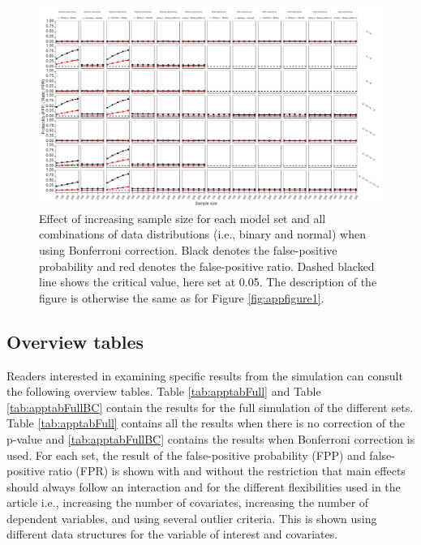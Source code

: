 \begin{landscape}
\begin{figure}[ht!]
\includegraphics[scale=0.75]{R/Analysis/Result/Figures/Figure1DSIBon.jpeg}
\centering
\caption{Effect of increasing sample size for each model set and all combinations of data distributions (i.e., binary and normal) when using Bonferroni correction. Black denotes the false-positive probability and red denotes the false-positive ratio. Dashed blacked line shows the critical value, here set at 0.05. The description of the figure is otherwise the same as for Figure \ref{fig:appfigure1}.}
\label{fig:appfigure12}
\end{figure}
\end{landscape}

\subsection{Overview tables}
\label{overviewtable}
Readers interested in examining specific results from the simulation can consult the following overview tables. Table \ref{tab:apptabFull} and Table \ref{tab:apptabFullBC} contain the results for the full simulation of the different sets. Table \ref{tab:apptabFull} contains all the results when there is no correction of the p-value and \ref{tab:apptabFullBC} contains the results when Bonferroni correction is used. For each set, the result of the false-positive probability (FPP) and false-positive ratio (FPR) is shown with and without the restriction that main effects should always follow an interaction and for the different flexibilities used in the article i.e., increasing the number of covariates, increasing the number of dependent variables, and using several outlier criteria. This is shown using different data structures for the variable of interest and covariates. 
\begin{landscape}
\scriptsize

\end{landscape}

\begin{landscape}
\scriptsize

\end{landscape}


